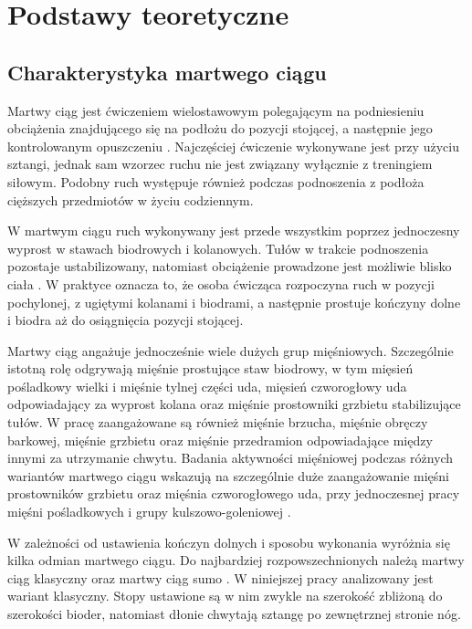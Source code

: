 \section{Podstawy teoretyczne}

\subsection{Charakterystyka martwego ciągu}

Martwy ciąg jest ćwiczeniem wielostawowym polegającym na podniesieniu obciążenia znajdującego się na podłożu do pozycji stojącej, a następnie jego kontrolowanym opuszczeniu \cite{hanen2025deadlift}. Najczęściej ćwiczenie wykonywane jest przy użyciu sztangi, jednak sam wzorzec ruchu nie jest związany wyłącznie z treningiem siłowym. Podobny ruch występuje również podczas podnoszenia z podłoża cięższych przedmiotów w życiu codziennym.

W martwym ciągu ruch wykonywany jest przede wszystkim poprzez jednoczesny wyprost w stawach biodrowych i kolanowych. Tułów w trakcie podnoszenia pozostaje ustabilizowany, natomiast obciążenie prowadzone jest możliwie blisko ciała \cite{hanen2025deadlift,ramirez2022lowback}. W praktyce oznacza to, że osoba ćwicząca rozpoczyna ruch w pozycji pochylonej, z ugiętymi kolanami i biodrami, a następnie prostuje kończyny dolne i biodra aż do osiągnięcia pozycji stojącej.

Martwy ciąg angażuje jednocześnie wiele dużych grup mięśniowych. Szczególnie istotną rolę odgrywają mięśnie prostujące staw biodrowy, w tym mięsień pośladkowy wielki i mięśnie tylnej części uda, mięsień czworogłowy uda odpowiadający za wyprost kolana oraz mięśnie prostowniki grzbietu stabilizujące tułów. W pracę zaangażowane są również mięśnie brzucha, mięśnie obręczy barkowej, mięśnie grzbietu oraz mięśnie przedramion odpowiadające między innymi za utrzymanie chwytu. Badania aktywności mięśniowej podczas różnych wariantów martwego ciągu wskazują na szczególnie duże zaangażowanie mięśni prostowników grzbietu oraz mięśnia czworogłowego uda, przy jednoczesnej pracy mięśni pośladkowych i grupy kulszowo-goleniowej \cite{martinfuentes2020deadlift}.

W zależności od ustawienia kończyn dolnych i sposobu wykonania wyróżnia się kilka odmian martwego ciągu. Do najbardziej rozpowszechnionych należą martwy ciąg klasyczny oraz martwy ciąg sumo \cite{hanen2025deadlift}. W niniejszej pracy analizowany jest wariant klasyczny. Stopy ustawione są w nim zwykle na szerokość zbliżoną do szerokości bioder, natomiast dłonie chwytają sztangę po zewnętrznej stronie nóg.

